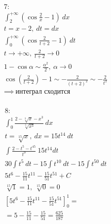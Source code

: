 \documentclass{report}
\begin{document}
\begin{multline}
    \text{7:}\\
    \int_{2}^{+\infty} (\cos{\frac{2}{x}} - 1)\ dx\\
    t = x - 2,\ dt = dx\\
    \int_{0}^{+\infty} (\cos{\frac{2}{t + 2}} - 1)\ dt\\
    t \to +\infty,\ \frac{2}{t + 2} \to 0\\
    1 - \cos{\alpha} \sim \frac{\alpha^2}{2},\ \alpha \to 0\\
    \cos{(\frac{2}{t + 2})} - 1 \sim -\frac{2}{(t + 2)^2} \sim -\frac{2}{t^2}\\
    \implies\ \text{интеграл сходится}\\
\end{multline}

\begin{multline}
    \text{8:}\\
    \int_{0}^{1} \frac{2 - \sqrt[3]{x} - x^3}{\sqrt[5]{x^3}}\ dx\\
    t = \sqrt[15]{x},\ dx = 15t^{14}\ dt\\
    \int \frac{2 - t^{5} - t^{45}}{t^{9}}\ 15t^{14} dt\\
    30 \int t^{5}\ dt - 15 \int t^{10}\ dt - 15 \int t^{50}\ dt\\
    5t^6 - \frac{15}{11} t^{11} - \frac{15}{51} t^{51} + C\\
    \sqrt[15]{1} = 1,\ \sqrt[15]{0} = 0\\
    [5t^6 - \frac{15}{11} t^{11} - \frac{15}{51} t^{51}]_{0}^{1} =\\
    = 5 - \frac{15}{11} - \frac{15}{51} = \frac{625}{187}\\
\end{multline}
\end{document}
